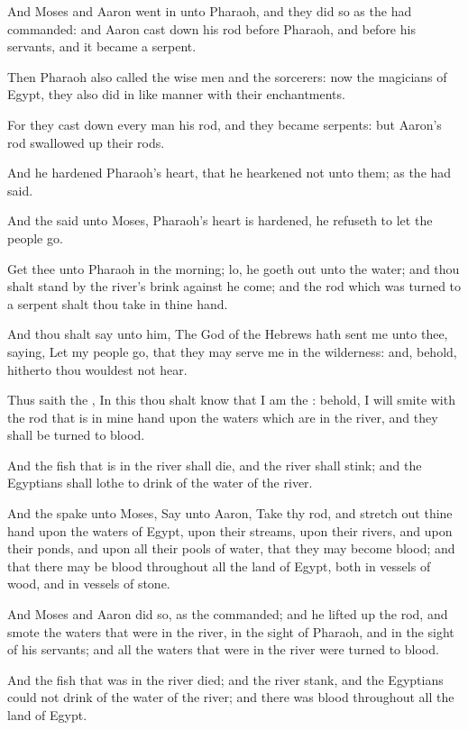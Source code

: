 \verse And Moses and Aaron went in unto Pharaoh, and they did so as the \LORD had commanded: and Aaron cast down his rod before Pharaoh, and before his servants, and it became a serpent.

\verse Then Pharaoh also called the wise men and the sorcerers: now the magicians of Egypt, they also did in like manner with their enchantments.

\verse For they cast down every man his rod, and they became serpents: but Aaron's rod swallowed up their rods.

\verse And he hardened Pharaoh's heart, that he hearkened not unto them; as the \LORD had said.

\verse And the \LORD said unto Moses, Pharaoh's heart is hardened, he refuseth to let the people go.

\verse Get thee unto Pharaoh in the morning; lo, he goeth out unto the water; and thou shalt stand by the river's brink against he come; and the rod which was turned to a serpent shalt thou take in thine hand.

\verse And thou shalt say unto him, The \LORD God of the Hebrews hath sent me unto thee, saying, Let my people go, that they may serve me in the wilderness: and, behold, hitherto thou wouldest not hear.

\verse Thus saith the \LORD, In this thou shalt know that I am the \LORD: behold, I will smite with the rod that is in mine hand upon the waters which are in the river, and they shall be turned to blood.

\verse And the fish that is in the river shall die, and the river shall stink; and the Egyptians shall lothe to drink of the water of the river.

\verse And the \LORD spake unto Moses, Say unto Aaron, Take thy rod, and stretch out thine hand upon the waters of Egypt, upon their streams, upon their rivers, and upon their ponds, and upon all their pools of water, that they may become blood; and that there may be blood throughout all the land of Egypt, both in vessels of wood, and in vessels of stone.

\verse And Moses and Aaron did so, as the \LORD commanded; and he lifted up the rod, and smote the waters that were in the river, in the sight of Pharaoh, and in the sight of his servants; and all the waters that were in the river were turned to blood.

\verse And the fish that was in the river died; and the river stank, and the Egyptians could not drink of the water of the river; and there was blood throughout all the land of Egypt.

